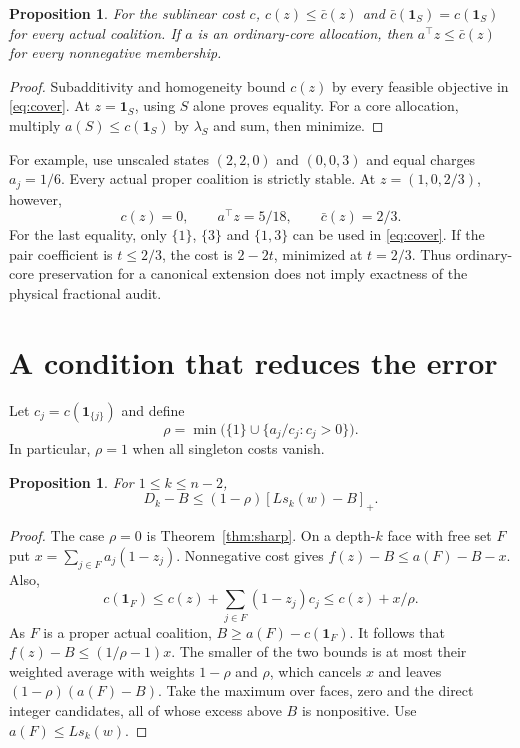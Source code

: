 \documentclass[11pt,a4paper]{article}
\newtheorem{proposition}[theorem]{Proposition}
\theoremstyle{remark}
\newcommand{\one}{\mathbf 1}
\newcommand{\pos}[1]{\left[#1\right]_+}
\begin{document}
\begin{proposition}\label{prop:cover}
For the sublinear cost $c$,
$c(z)\le\bar c(z)$ and $\bar c(\one_S)=c(\one_S)$ for every
actual coalition. If $a$ is an ordinary-core allocation, then
$a^\top z\le\bar c(z)$ for every nonnegative membership.
\end{proposition}
\begin{proof}
Subadditivity and homogeneity bound $c(z)$ by every feasible
objective in \eqref{eq:cover}. At $z=\one_S$, using $S$ alone
proves equality. For a core allocation, multiply
$a(S)\le c(\one_S)$ by $\lambda_S$ and sum, then minimize.
\end{proof}

For example, use unscaled states $(2,2,0)$ and $(0,0,3)$ and equal
charges $a_j=1/6$. Every actual proper coalition is strictly stable.
At $z=(1,0,2/3)$, however,
\[
 c(z)=0,\qquad a^\top z=5/18,\qquad \bar c(z)=2/3.
\]
For the last equality, only $\{1\}$, $\{3\}$ and $\{1,3\}$ can be
used in \eqref{eq:cover}. If the pair coefficient is $t\le2/3$,
the cost is $2-2t$, minimized at $t=2/3$. Thus ordinary-core
preservation for a canonical extension does not imply exactness
of the physical fractional audit.

\section{A condition that reduces the error}\label{sec:rho}

Let $c_j=c(\one_{\{j\}})$ and define
\[
 \rho=\min\bigl(\{1\}\cup\{a_j/c_j:c_j>0\}\bigr).
\]
In particular, $\rho=1$ when all singleton costs vanish.

\begin{proposition}\label{prop:rho}
For $1\le k\le n-2$,
\begin{equation}\label{eq:rho}
 D_k-B\le(1-\rho)\pos{Ls_k(w)-B}.
\end{equation}
\end{proposition}
\begin{proof}
The case $\rho=0$ is Theorem~\ref{thm:sharp}.
On a depth-$k$ face with free set $F$ put
$x=\sum_{j\in F}a_j(1-z_j)$. Nonnegative cost gives
$f(z)-B\le a(F)-B-x$. Also,
\[
 c(\one_F)\le c(z)+\sum_{j\in F}(1-z_j)c_j
            \le c(z)+x/\rho.
\]
As $F$ is a proper actual coalition, $B\ge a(F)-c(\one_F)$.
It follows that $f(z)-B\le(1/\rho-1)x$.
The smaller of the two bounds is at most their weighted average
with weights $1-\rho$ and $\rho$, which cancels $x$ and leaves
$(1-\rho)(a(F)-B)$. Take the maximum over faces, zero and the
direct integer candidates, all of whose excess above $B$ is
nonpositive. Use $a(F)\le Ls_k(w)$.
\end{proof}
\end{document}
